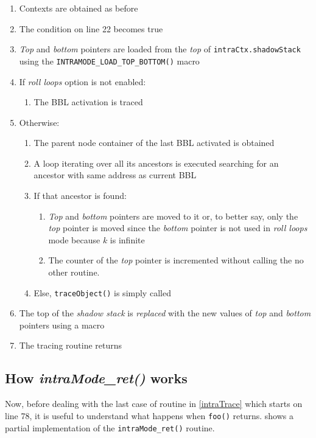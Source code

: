\documentclass[a4paper,10pt]{report}
\begin{document}
\begin{enumerate}
\item Contexts are obtained as before
\item The condition on line 22 becomes true
\item \emph{Top} and \emph{bottom} pointers are loaded from the \emph{top}
of \verb|intraCtx.shadowStack| using the \verb|INTRAMODE_LOAD_TOP_BOTTOM()| macro
\item If \emph{roll loops} option is not enabled:
\begin{enumerate}
\item The BBL activation is traced
\end{enumerate}
\item Otherwise:
\begin{enumerate}
\item The parent node container of the last BBL activated is obtained
\item A loop iterating over all its ancestors is executed 
searching for an ancestor with same address as current BBL
\item If that ancestor is found:
\begin{enumerate}
\item \emph{Top} and \emph{bottom}
pointers are moved to it or, to better say, only the \emph{top} pointer
is moved since the \emph{bottom} pointer is not used in \emph{roll loops} mode
because $k$ is infinite
\item The counter of the \emph{top} pointer
is incremented without calling the no other routine.
\end{enumerate}
\item Else, \verb|traceObject()| is simply called
\end{enumerate}
\item The top of the \emph{shadow stack} is \emph{replaced} with the new values 
of \emph{top} and \emph{bottom} pointers using a macro
\item The tracing routine returns
\end{enumerate}

\subsection{How \emph{intraMode\_ret()} works}

Now, before dealing with the last case of routine in \cref{intraTrace} 
which starts on line 78, it is useful to understand 
what happens when \verb|foo()| returns.  shows
a partial implementation of the \verb|intraMode_ret()| routine.
\end{document}
